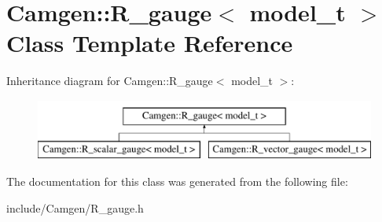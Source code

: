 \hypertarget{a00464}{}\section{Camgen\+:\+:R\+\_\+gauge$<$ model\+\_\+t $>$ Class Template Reference}
\label{a00464}
Inheritance diagram for Camgen\+:\+:R\+\_\+gauge$<$ model\+\_\+t $>$\+:\begin{figure}[H]
\begin{center}
\leavevmode
\includegraphics[height=2.000000cm]{a00464}
\end{center}
\end{figure}


The documentation for this class was generated from the following file\+:\begin{DoxyCompactItemize}
\item 
include/\+Camgen/R\+\_\+gauge.\+h\end{DoxyCompactItemize}
